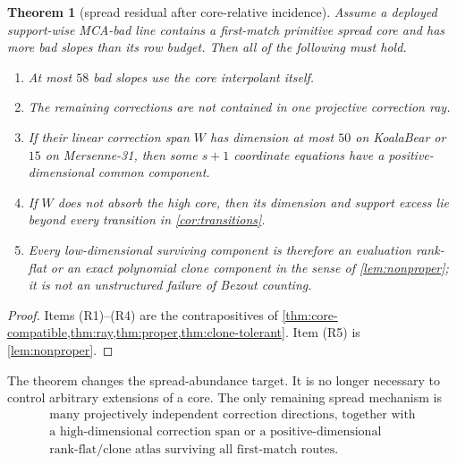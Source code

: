 \documentclass[11pt,a4paper]{amsart}
\numberwithin{equation}{section}
\newtheorem{theorem}{Theorem}[section]
\theoremstyle{remark}
\begin{document}
\begin{theorem}[spread residual after core-relative incidence]\label{thm:residual}
Assume a deployed support-wise MCA-bad line contains a first-match primitive spread core and has more bad slopes than its row budget.  Then all of the following must hold.
\begin{enumerate}[label=\textup{(R\arabic*)}]
\item At most $58$ bad slopes use the core interpolant itself.
\item The remaining corrections are not contained in one projective correction ray.
\item If their linear correction span $W$ has dimension at most $50$ on KoalaBear or $15$ on Mersenne-31, then some $s+1$ coordinate equations have a positive-dimensional common component.
\item If $W$ does not absorb the high core, then its dimension and support excess lie beyond every transition in \cref{cor:transitions}.
\item Every low-dimensional surviving component is therefore an evaluation rank-flat or an exact polynomial clone component in the sense of \cref{lem:nonproper}; it is not an unstructured failure of Bezout counting.
\end{enumerate}
\end{theorem}

\begin{proof}
Items (R1)--(R4) are the contrapositives of \cref{thm:core-compatible,thm:ray,thm:proper,thm:clone-tolerant}.  Item (R5) is \cref{lem:nonproper}.
\end{proof}

The theorem changes the spread-abundance target.  It is no longer necessary to control arbitrary extensions of a core.  The only remaining spread mechanism is
\[
 \boxed{
 \begin{array}{c}
 \text{many projectively independent correction directions, together with}\\
 \text{a high-dimensional correction span or a positive-dimensional}\\
 \text{rank-flat/clone atlas surviving all first-match routes.}
 \end{array}
 }
\]
\end{document}
